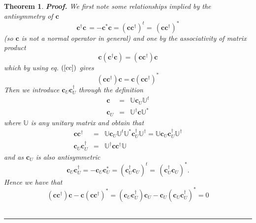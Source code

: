 \documentclass[aps,preprint]{revtex4}
\newtheorem{theorem}{Theorem}
\newenvironment{proof}[1][Proof]{\noindent\textbf{#1.} }{\ \rule{0.5em}{0.5em}}
\begin{document}
\begin{theorem}
\begin{proof}
We first note some relationships implied by the antisymmetry of $\mathbf{c}$%
\begin{equation}
\mathbf{c}^{\dagger }\mathbf{c\,=-c}^{\ast }\mathbf{c}=\left( \mathbf{cc}%
^{\dagger }\right) ^{t}=\mathbf{\,}\left( \mathbf{cc}^{\dagger }\right)
^{\ast }  \label{cc}
\end{equation}%
(so $\mathbf{c}$ is not a normal operator in general) and one by the
associativity of matrix product 
\begin{equation}
\mathbf{c}\left( \mathbf{c}^{\dagger }\mathbf{c}\right) =\left( \mathbf{cc}%
^{\dagger }\right) \mathbf{c}
\end{equation}%
which by using eq. $\left( \ref{cc}\right) $ gives 
\begin{equation}
\left( \mathbf{cc}^{\dagger }\right) \mathbf{c=c}\left( \mathbf{cc}^{\dagger
}\right) ^{\ast }  \label{cr}
\end{equation}%
Then we introduce $\mathbf{c}_{U}\mathbf{c}_{U}^{\dagger }$ through the
definition 
\begin{eqnarray}
\mathbf{c} &=&\mathbb{U}\mathbf{c}_{U}\mathbb{U}^{t} \\
\mathbf{c}_{U} &=&\mathbb{U}^{\dagger }\mathbf{c}\mathbb{U}^{\ast }
\end{eqnarray}%
where $\mathbb{U}$ is any unitary matrix and obtain that 
\begin{eqnarray}
\mathbf{cc}^{\dagger } &=&\mathbb{U}\mathbf{c}_{U}\mathbb{U}^{t}\mathbb{U}%
^{\ast }\mathbf{c}_{U}^{\dagger }\mathbb{U}^{\dagger }=\mathbb{U}\mathbf{c}%
_{U}\mathbf{c}_{U}^{\dagger }\mathbb{U}^{\dagger }  \nonumber \\
\mathbf{c}_{U}\mathbf{c}_{U}^{\dagger } &=&\mathbb{U}^{\dagger }\mathbf{cc}%
^{\dagger }\mathbb{U}
\end{eqnarray}%
and as $\mathbf{c}_{U}$ is also antisymmetric 
\begin{equation}
\mathbf{c}_{U}\mathbf{c}_{U}^{\dagger }=-\mathbf{c}_{U}\mathbf{c}_{U}^{\ast
}=\left( \mathbf{c}_{U}^{\dagger }\mathbf{c}_{U}\right) ^{t}=\mathbf{\,}%
\left( \mathbf{c}_{U}^{\dagger }\mathbf{c}_{U}\right) ^{\ast }.
\end{equation}%
Hence we have that 
\begin{equation}
\left( \mathbf{cc}^{\dagger }\right) \mathbf{c-c}\left( \mathbf{cc}^{\dagger
}\right) ^{\ast }=\left( \mathbf{c}_{U}\mathbf{c}_{U}^{\dagger }\right) 
\mathbf{c}_{U}-\mathbf{c}_{U}\left( \mathbf{c}_{U}\mathbf{c}_{U}^{\dagger
}\right) ^{\ast }=0  \label{cu}

\end{equation}
\end{proof}
\end{theorem}
\end{document}
